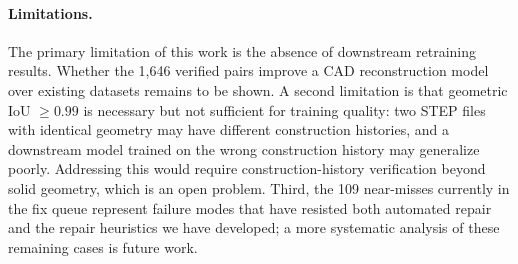 \paragraph{Limitations.}
The primary limitation of this work is the absence of downstream retraining results.
Whether the 1,646 verified pairs improve a CAD reconstruction model over existing datasets remains to be shown.
A second limitation is that geometric IoU $\geq 0.99$ is necessary but not sufficient for training quality: two STEP files with identical geometry may have different construction histories, and a downstream model trained on the wrong construction history may generalize poorly.
Addressing this would require construction-history verification beyond solid geometry, which is an open problem.
Third, the 109 near-misses currently in the fix queue represent failure modes that have resisted both automated repair and the repair heuristics we have developed; a more systematic analysis of these remaining cases is future work.
